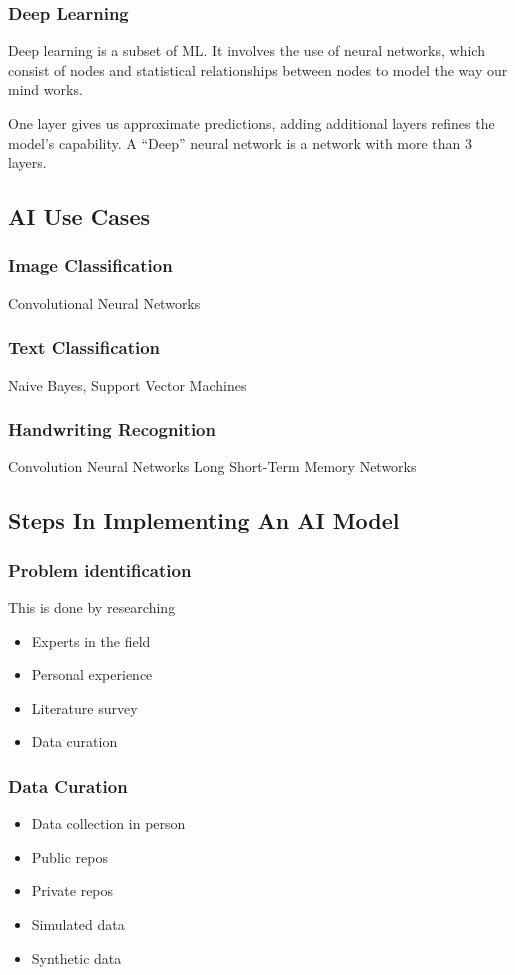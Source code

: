 \documentclass[11pt]{article}
\begin{document}
\subsubsection{Deep Learning}
\label{sec:org8b35a73}
Deep learning is a subset of ML.
It involves the use of neural networks, which consist of nodes and statistical relationships between nodes to model the way our mind works.

One layer gives us approximate predictions, adding additional layers refines the model's capability. A ``Deep'' neural network is a network with more than 3 layers.
\subsection{AI Use Cases}
\label{sec:orgb613bb3}
\subsubsection{Image Classification}
\label{sec:org29ffc0d}
Convolutional Neural Networks
\subsubsection{Text Classification}
\label{sec:org3bf8f7b}
Naive Bayes, Support Vector Machines
\subsubsection{Handwriting Recognition}
\label{sec:orgb468689}
Convolution Neural Networks
Long Short-Term Memory Networks
\subsection{Steps In Implementing An AI Model}
\label{sec:org2299798}
\subsubsection{Problem identification}
\label{sec:org2d06743}
This is done by researching
\begin{itemize}
\item Experts in the field
\item Personal experience
\item Literature survey
\item Data curation
\end{itemize}
\subsubsection{Data Curation}
\label{sec:org306ef1b}
\begin{itemize}
\item Data collection in person
\item Public repos
\item Private repos
\item Simulated data
\item Synthetic data
\end{itemize}
\end{document}
